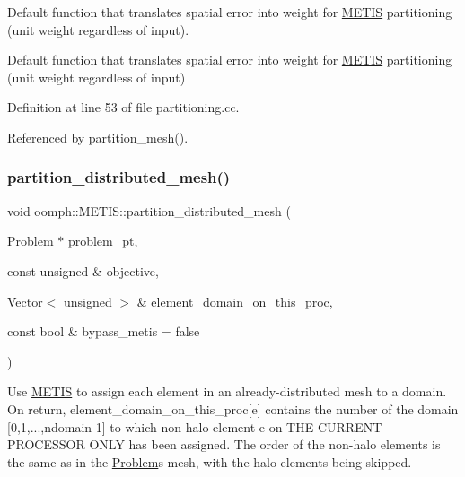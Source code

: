 Default function that translates spatial error into weight for \hyperlink{namespaceoomph_1_1METIS}{M\+E\+T\+IS} partitioning (unit weight regardless of input). 

Default function that translates spatial error into weight for \hyperlink{namespaceoomph_1_1METIS}{M\+E\+T\+IS} partitioning (unit weight regardless of input) 

Definition at line 53 of file partitioning.\+cc.



Referenced by partition\+\_\+mesh().

\mbox{\label{namespaceoomph_1_1METIS_a9d95103cfa79d38f80b3b0a6db949701}} 
\subsubsection{\texorpdfstring{partition\+\_\+distributed\+\_\+mesh()}{partition\_distributed\_mesh()}}
{\footnotesize\ttfamily void oomph\+::\+M\+E\+T\+I\+S\+::partition\+\_\+distributed\+\_\+mesh (\begin{DoxyParamCaption}\item[{\hyperlink{classoomph_1_1Problem}{Problem} $\ast$}]{problem\+\_\+pt,  }\item[{const unsigned \&}]{objective,  }\item[{\hyperlink{classoomph_1_1Vector}{Vector}$<$ unsigned $>$ \&}]{element\+\_\+domain\+\_\+on\+\_\+this\+\_\+proc,  }\item[{const bool \&}]{bypass\+\_\+metis = {\ttfamily false} }\end{DoxyParamCaption})}



Use \hyperlink{namespaceoomph_1_1METIS}{M\+E\+T\+IS} to assign each element in an already-\/distributed mesh to a domain. On return, element\+\_\+domain\+\_\+on\+\_\+this\+\_\+proc\mbox{[}e\mbox{]} contains the number of the domain \mbox{[}0,1,...,ndomain-\/1\mbox{]} to which non-\/halo element e on T\+HE C\+U\+R\+R\+E\+NT P\+R\+O\+C\+E\+S\+S\+OR O\+N\+LY has been assigned. The order of the non-\/halo elements is the same as in the \hyperlink{classoomph_1_1Problem}{Problem}\textquotesingle{}s mesh, with the halo elements being skipped. 

